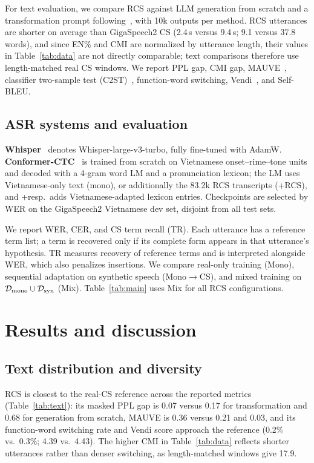 \documentclass[letterpaper]{article}
\newcommand{\cD}{\mathcal{D}}
\begin{document}
For text evaluation, we compare RCS against LLM generation
from scratch and a transformation prompt
following~\cite{liu2026lens}, with 10k outputs per method.
RCS utterances are shorter on average than GigaSpeech2 CS
(2.4\,s versus 9.4\,s; 9.1 versus 37.8 words), and since
EN\% and CMI are normalized by utterance length, their values
in Table~\ref{tab:data} are not directly comparable; text
comparisons therefore use length-matched real CS windows. We report PPL gap, CMI gap,
MAUVE~\cite{pillutla2021mauve}, classifier two-sample test
(C2ST)~\cite{lopezpaz2017c2st}, function-word switching,
Vendi~\cite{friedman2023vendi}, and Self-BLEU.

\subsection{ASR systems and evaluation}
\textbf{Whisper}~\cite{radford2023whisper} denotes
Whisper-large-v3-turbo, fully fine-tuned with AdamW.
\textbf{Conformer-CTC}~\cite{gulati2020conformer,graves2006ctc}
is trained from scratch on Vietnamese onset--rime--tone units
and decoded with a 4-gram word LM and a pronunciation lexicon;
the LM uses Vietnamese-only text (mono), or additionally
the 83.2k RCS transcripts (+RCS), and +resp.\ adds
Vietnamese-adapted lexicon entries. Checkpoints are selected
by WER on the GigaSpeech2 Vietnamese dev set, disjoint from
all test sets.

We report WER, CER, and CS term recall (TR).
Each utterance has a reference term list; a term is recovered
only if its complete form appears in that utterance's
hypothesis. TR measures recovery of reference terms and is
interpreted alongside WER, which also penalizes insertions.
We compare real-only training (Mono), sequential adaptation
on synthetic speech (Mono$\rightarrow$CS), and mixed
training on $\cD_{\rm mono}\cup\cD_{\rm syn}$ (Mix).
Table~\ref{tab:main} uses Mix for all RCS configurations.

\section{Results and discussion}
\label{sec:results}
\subsection{Text distribution and diversity}
RCS is closest to the real-CS reference across the reported
metrics (Table~\ref{tab:text}): its masked PPL gap is 0.07
versus 0.17 for transformation and 0.68 for generation from
scratch, MAUVE is 0.36 versus 0.21 and 0.03, and its
function-word switching rate and Vendi score approach the
reference (0.2\% vs.\ 0.3\%; 4.39 vs.\ 4.43). The higher CMI
in Table~\ref{tab:data} reflects shorter utterances rather
than denser switching, as length-matched windows give 17.9.
\end{document}
